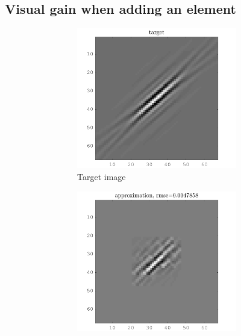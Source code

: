 \subsection{Visual gain when adding an element}

\begin{figure}[!ht]\centering
\begin{subfigure}[b]{0.99\textwidth}\centering
	\begin{subfigure}[b]{0.32\textwidth}\centering
	\includegraphics[width=\textwidth]{figures/before_after/xp_128x128_sc2_angl1_K3_S3_node4before_target.png}
		\caption{Target image}
	\end{subfigure}
	\begin{subfigure}[b]{0.32\textwidth}\centering
	\includegraphics[width=\textwidth]{figures/before_after/xp_128x128_sc2_angl1_K3_S3_node4before_approx.png}

\end{subfigure}
\end{subfigure}
\end{figure}
